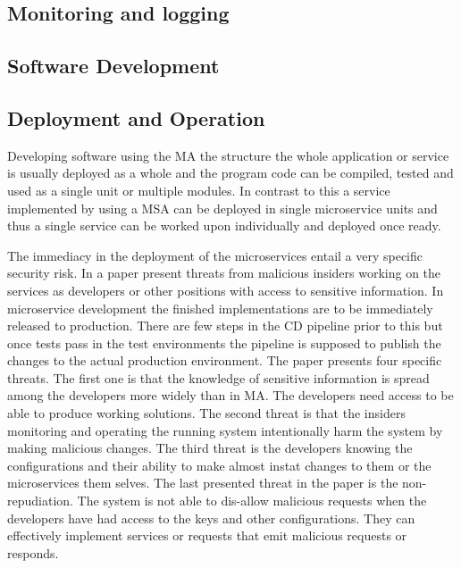 \subsection{Monitoring and logging}
\begin{sloppypar}

\end{sloppypar}

\subsection{Software Development}
\begin{sloppypar}

\end{sloppypar}

\subsection{Deployment and Operation}
\begin{sloppypar}
    Developing software using the MA the structure the whole application or service 
    is usually deployed as a whole and the program code can be compiled, tested 
    and used as a single unit or multiple modules. In contrast to this a service 
    implemented by using a MSA can be deployed in single microservice units and 
    thus a single service can be worked upon individually and deployed once ready.
\end{sloppypar}
\begin{sloppypar}
    The immediacy in the deployment of the microservices entail a very specific 
    security risk. In a paper \citet{integinside} present threats from malicious 
    insiders working on the services as developers or other positions with access
    to sensitive information. In microservice development the finished 
    implementations are to be immediately released to production. There are few 
    steps in the CD pipeline prior to this but once tests pass in the test 
    environments the pipeline is supposed to publish the changes to the actual 
    production environment. The paper presents four specific threats. The first 
    one is that the knowledge of sensitive information is spread among the 
    developers more widely than in MA. The developers need access to be able to 
    produce working solutions. The second threat is that the insiders 
    monitoring and operating the running system intentionally harm the system 
    by making malicious changes. The third threat is the developers knowing the 
    configurations and their ability to make almost instat changes to them or 
    the microservices them selves. The last presented threat in the paper is the 
    non-repudiation. The system is not able to dis-allow malicious requests 
    when the developers have had access to the keys and other configurations. 
    They can effectively implement services or requests that emit malicious 
    requests or responds.
\end{sloppypar}
